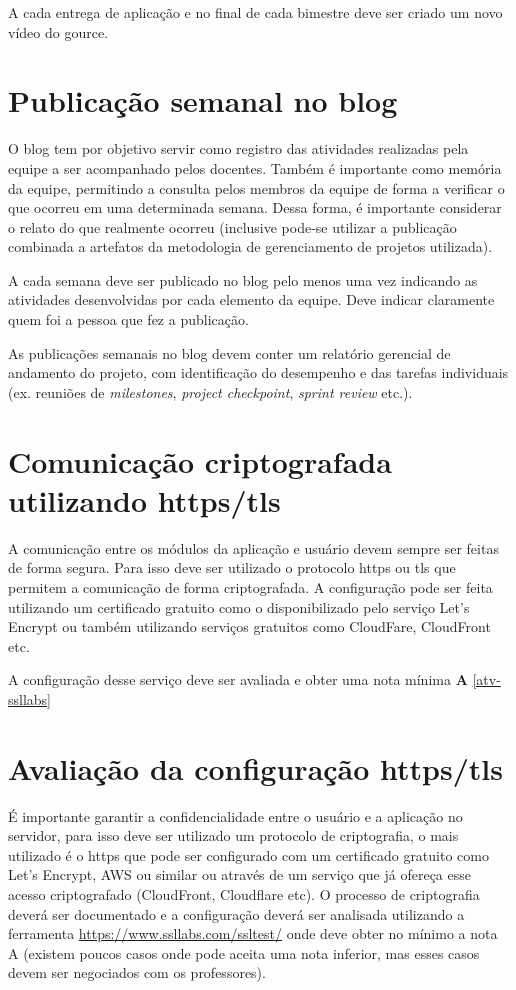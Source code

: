 A cada entrega de aplicação e no final de cada bimestre deve ser criado um novo vídeo do \gls{gource}.



\section{Publicação semanal no blog}\label{atv-publicacao-blog}

O blog tem por objetivo servir como registro das atividades realizadas pela equipe a ser acompanhado pelos docentes. Também é importante como memória da equipe, permitindo a consulta pelos membros da equipe de forma a verificar o que ocorreu em uma determinada semana. Dessa forma, é importante considerar o relato do que realmente ocorreu (inclusive pode-se utilizar a publicação combinada a artefatos da metodologia de gerenciamento de projetos utilizada).

A cada semana deve ser publicado no blog pelo menos uma vez indicando as atividades desenvolvidas por cada elemento da equipe. Deve indicar claramente quem foi a pessoa que fez a publicação.

As publicações semanais no blog devem conter um relatório gerencial de andamento do projeto, com identificação do desempenho e das tarefas individuais (ex. reuniões de \emph{milestones}, \emph{project checkpoint}, \emph{sprint review} etc.).


\section{Comunicação criptografada utilizando \acs{https}/\acs{tls}}\label{atv-https}
A comunicação entre os  módulos da aplicação  e usuário devem sempre ser feitas de forma segura. Para isso deve ser utilizado o protocolo \ac{https} ou \ac{tls} que permitem a comunicação de forma criptografada. A configuração pode ser feita utilizando um certificado gratuito como o disponibilizado pelo serviço Let's Encrypt ou também utilizando serviços gratuitos como CloudFare, CloudFront etc.

A configuração desse serviço deve ser avaliada e obter uma nota mínima \textbf{A} \autoref{atv-ssllabs}

\section{Avaliação da configuração \acs{https}/\acs{tls}}\label{atv-ssllabs}

É importante garantir a confidencialidade entre o usuário e a aplicação no servidor, para isso deve ser utilizado um protocolo de criptografia, o mais utilizado é o \ac{https} que pode ser configurado com um certificado gratuito como Let's Encrypt, AWS ou similar ou através de um serviço que já ofereça esse acesso criptografado (CloudFront, Cloudflare etc). O processo de criptografia deverá ser documentado e a configuração deverá ser analisada utilizando a ferramenta \url{https://www.ssllabs.com/ssltest/} onde deve obter no mínimo a nota A (existem poucos casos onde pode aceita uma nota inferior, mas esses casos devem ser negociados com os professores).




